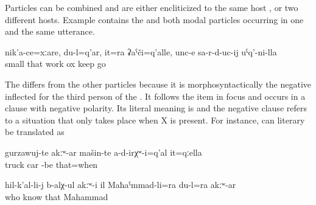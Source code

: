 Particles can be combined and are either encliticized to the same host ,  or two different hosts. Example  contains the  and both modal particles occurring in one and the same utterance.
%
\begin{exe}
	\ex	\label{ex:‎Although I was little, I myself went behind the oxen, this is also work}
	\gll	nik'a-ce=xːare,	du-l=q'ar, it=ra	ʡaˁči=q'alle,	unc-e	sa-r-d-uc-ij	uˁq'-ni-lla\\
		small		that	work	ox	keep		go\\
	\glt	{}
\end{exe}

The    differs from the other particles because it is morphosyntactically the negative  inflected for the third person of the . It follows the item in focus and occurs in a clause with negative polarity. Its literal meaning is  and the negative clause refers to a situation that only takes place when X is present. For instance,  can literary be translated as 
%
\begin{exe}
	\ex	\label{ex:At that time there were only trucks constituents}
	\gll	gurzawuj-te	akːʷ-ar	mašin-te	a-d-irχʷ-i=q'al	it=qːella\\
		truck 		car	-be	that=when\\
	\glt	{} 

	\ex	\label{ex:‎Nobody knew it, only Mahammad and me}
	\gll	hil-k'al-li-j	b-alχ-ul	akːʷ-i	il	Maħaˁmmad-li=ra	du-l=ra	akːʷ-ar\\
		who know		that	Mahammad		\\
	\glt	{}
\end{exe}

